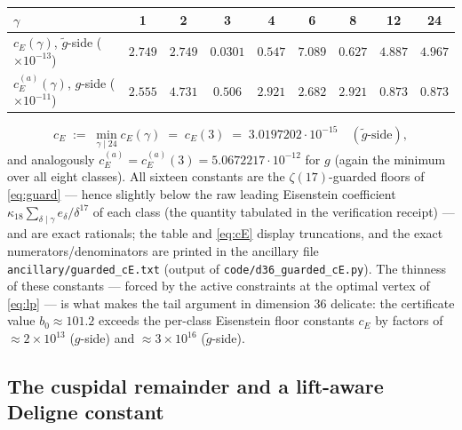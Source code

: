 \documentclass[11pt]{article}
\theoremstyle{remark}
\begin{document}
\begin{center}
\begin{tabular}{@{}lcccccccc@{}}
\toprule
$\gamma$ & 1 & 2 & 3 & 4 & 6 & 8 & 12 & 24\\
\midrule
$c_E(\gamma)$, $\tilde g$-side ($\times10^{-13}$) &
$2.749$ & $2.749$ & $\mathbf{0.0301}$ & $0.547$ & $7.089$ & $0.627$ &
$4.887$ & $4.967$\\
$c_E^{(a)}(\gamma)$, $g$-side ($\times10^{-11}$) &
$2.555$ & $4.731$ & $\mathbf{0.506}$ & $2.921$ & $2.682$ & $2.921$ &
$0.873$ & $0.873$\\
\bottomrule
\end{tabular}
\end{center}

\begin{equation}\label{eq:cE}
c_E \;:=\; \min_{\gamma\mid24}c_E(\gamma)\;=\;c_E(3)
\;=\;3.0197202\cdot10^{-15}\quad(\tilde g\text{-side}),
\end{equation}
and analogously $c_E^{(a)}=c_E^{(a)}(3)=5.0672217\cdot10^{-12}$ for
$g$ (again the minimum over all eight classes). All sixteen constants
are the $\zeta(17)$-guarded floors of \eqref{eq:guard} --- hence slightly
below the raw leading Eisenstein coefficient
$\kappa_{18}\sum_{\delta\mid\gamma}e_\delta/\delta^{17}$ of each class
(the quantity tabulated in the verification receipt) --- and are exact
rationals; the table and \eqref{eq:cE} display truncations,
and the exact numerators/denominators are printed in the ancillary
file \texttt{ancillary/guarded\_cE.txt} (output of
\texttt{code/d36\_guarded\_cE.py}).
The thinness of these constants --- forced by the active constraints at
the optimal vertex of \eqref{eq:lp} --- is what makes the tail argument
in dimension $36$ delicate: the certificate value $b_0\approx101.2$
exceeds the per-class Eisenstein floor constants $c_E$ by factors of
$\approx2\times10^{13}$ ($g$-side) and $\approx3\times10^{16}$
($\tilde g$-side).

\subsection{The cuspidal remainder and a lift-aware Deligne constant}
\end{document}
